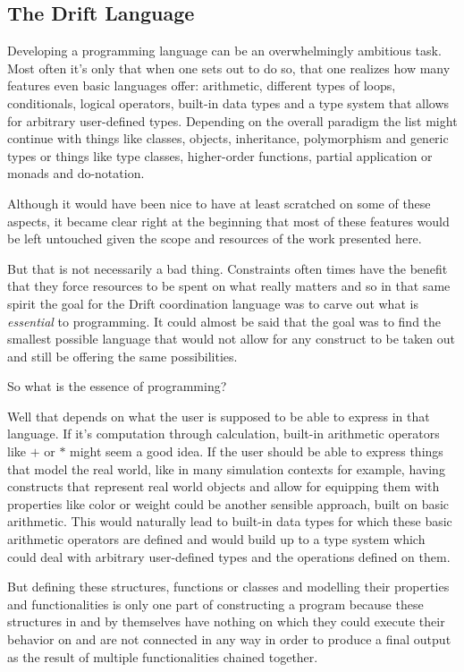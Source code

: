 \subsection{The Drift Language}
\label{driftlang}

Developing a programming language can be an overwhelmingly
ambitious task. Most often it's only that when one sets out
to do so, that one realizes how many features even
basic languages offer: arithmetic, different types of loops,
conditionals, logical operators, built-in data types and a
type system that allows for arbitrary user-defined types.
Depending on the overall paradigm the list might continue
with things like classes, objects, inheritance, polymorphism
and generic types or things like type classes, higher-order
functions, partial application or monads and do-notation.

Although it would have been nice to have at least scratched on
some of these aspects, it became clear right at the beginning
that most of these features would be left untouched given the
scope and resources of the work presented here.

But that is not necessarily a bad thing. Constraints often times
have the benefit that they force resources to be spent on what
really matters and so in that same spirit the goal for the
Drift coordination language was to carve out what is
\textit{essential} to programming. It could almost be said that
the goal was to find the smallest possible language that
would not allow for any construct to be taken out and still be
offering the same possibilities.
\newline

So what is the essence of programming?

Well that depends on what the user is supposed to be able to express
in that language. If it's computation through calculation, built-in
arithmetic operators like $+$ or $*$ might seem a good idea. If
the user should be able to express things that model the real world,
like in many simulation contexts for example, having constructs
that represent real world objects and allow for equipping them with
properties like color or weight could be another sensible approach,
built on basic arithmetic. This would naturally lead to built-in
data types for which these basic arithmetic operators are
defined and would build up to a type system which could deal with
arbitrary user-defined types and the operations defined on them.

But defining these structures, functions or classes and modelling their
properties and functionalities is only one part of constructing
a program because these structures in and by themselves have nothing
on which they could execute their behavior on and are not connected
in any way in order to produce a final output as the result of
multiple functionalities chained together.

